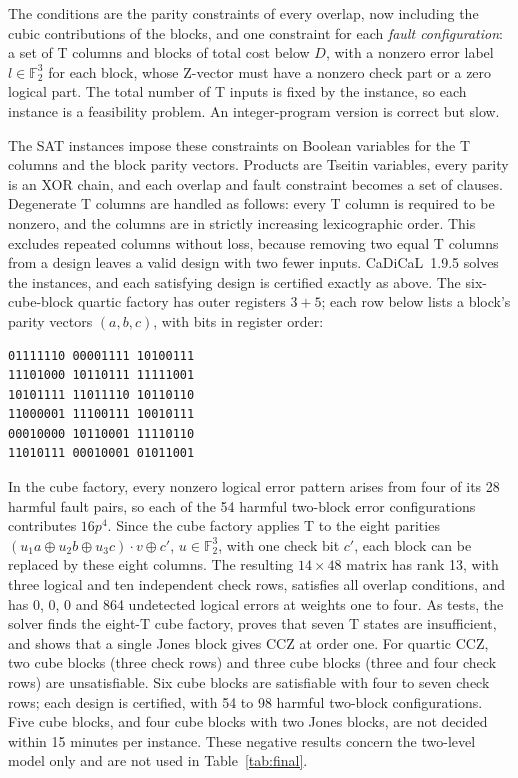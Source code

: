 \documentclass[aps,prl,reprint,twocolumn,amsmath,amssymb,floatfix,nofootinbib,superscriptaddress]{revtex4-2}
\newcommand{\F}{\mathbb F_2}
\begin{document}
The conditions are the parity constraints of every overlap, now including the cubic contributions of the blocks, and one constraint for each \emph{fault configuration}: a set of T columns and blocks of total cost below $D$, with a nonzero error label $l\in\F^3$ for each block, whose Z-vector must have a nonzero check part or a zero logical part. The total number of T inputs is fixed by the instance, so each instance is a feasibility problem. An integer-program version is correct but slow.

The SAT instances impose these constraints on Boolean variables for the T columns and the block parity vectors. Products are Tseitin variables, every parity is an XOR chain, and each overlap and fault constraint becomes a set of clauses. Degenerate T columns are handled as follows: every T column is required to be nonzero, and the columns are in strictly increasing lexicographic order. This excludes repeated columns without loss, because removing two equal T columns from a design leaves a valid design with two fewer inputs. CaDiCaL~1.9.5 solves the instances, and each satisfying design is certified exactly as above. The six-cube-block quartic factory has outer registers $3+5$; each row below lists a block's parity vectors $(a,b,c)$, with bits in register order:
{\footnotesize
\begin{verbatim}
01111110 00001111 10100111
11101000 10110111 11111001
10101111 11011110 10110110
11000001 11100111 10010111
00010000 10110001 11110110
11010111 00010001 01011001
\end{verbatim}}
\noindent In the cube factory, every nonzero logical error pattern arises from four of its 28 harmful fault pairs, so each of the 54 harmful two-block error configurations contributes $16p^4$. Since the cube factory applies T to the eight parities $(u_1a\oplus u_2b\oplus u_3c)\cdot v\oplus c'$, $u\in\F^3$, with one check bit $c'$, each block can be replaced by these eight columns. The resulting $14\times48$ matrix has rank 13, with three logical and ten independent check rows, satisfies all overlap conditions, and has 0, 0, 0 and 864 undetected logical errors at weights one to four. As tests, the solver finds the eight-T cube factory, proves that seven T states are insufficient, and shows that a single Jones block gives CCZ at order one. For quartic CCZ, two cube blocks (three check rows) and three cube blocks (three and four check rows) are unsatisfiable. Six cube blocks are satisfiable with four to seven check rows; each design is certified, with 54 to 98 harmful two-block configurations. Five cube blocks, and four cube blocks with two Jones blocks, are not decided within 15 minutes per instance. These negative results concern the two-level model only and are not used in Table~\ref{tab:final}.
\end{document}
